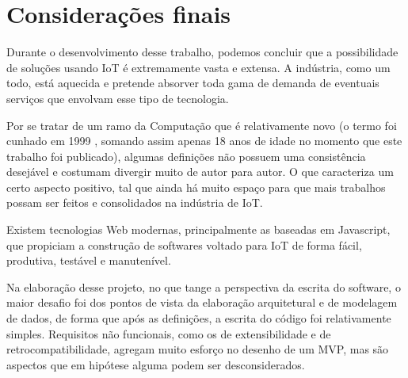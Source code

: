 \section*{Considerações finais}

Durante o desenvolvimento desse trabalho, podemos concluir que a possibilidade de soluções usando IoT é extremamente vasta e extensa. A indústria, como um todo, está aquecida e pretende absorver toda gama de demanda de eventuais serviços que envolvam esse tipo de tecnologia.

Por se tratar de um ramo da Computação que é relativamente novo (o termo foi cunhado em 1999 \cite{Kevin}, somando assim apenas 18 anos de idade no momento que este trabalho foi publicado), algumas definições não possuem uma consistência desejável e costumam divergir muito de autor para autor. O que caracteriza um certo aspecto positivo, tal que ainda há muito espaço para que mais trabalhos possam ser feitos e consolidados na indústria de IoT.

Existem tecnologias Web modernas, principalmente as baseadas em Javascript, que propiciam a construção de softwares voltado para IoT de forma fácil, produtiva, testável e manutenível.

Na elaboração desse projeto, no que tange a perspectiva da escrita do software, o maior desafio foi dos pontos de vista da elaboração arquitetural e de modelagem de dados, de forma que após as definições, a escrita do código foi relativamente simples. Requisitos não funcionais, como os de extensibilidade e de retrocompatibilidade, agregam muito esforço no desenho de um MVP, mas são aspectos que em hipótese alguma podem ser desconsiderados.

